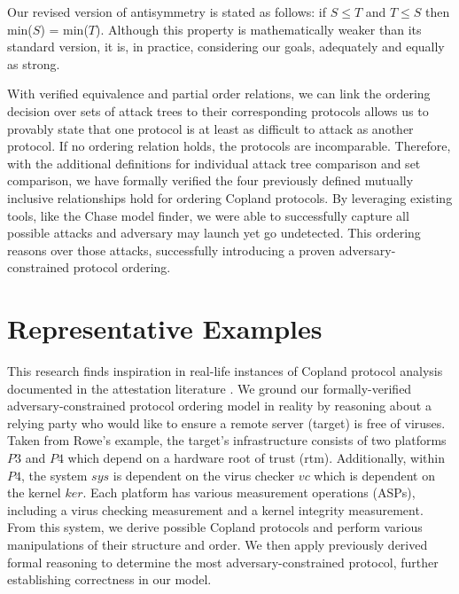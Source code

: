 \documentclass[runningheads]{llncs}
\theoremstyle{definition}
\begin{document}
Our revised version of antisymmetry is stated as follows: if $S \le T$ and $T \le S$ then min($S$) = min($T$). Although this property is mathematically weaker than its standard version, it is, in practice, considering our goals, adequately and equally as strong.


With verified equivalence and partial order relations, we can link the ordering decision over sets of attack trees to their corresponding protocols allows us to provably state that one protocol is at least as difficult to attack as another protocol. If no ordering relation holds, the protocols are incomparable. Therefore, with the additional definitions for individual attack tree comparison and set comparison, we have formally verified the four previously defined mutually inclusive relationships hold for ordering Copland protocols. By leveraging existing tools, like the Chase model finder, we were able to successfully capture all possible attacks and adversary may launch yet go undetected. This ordering reasons over those attacks, successfully introducing a proven adversary-constrained protocol ordering. 


\section{Representative Examples}

This research finds inspiration in real-life instances of Copland protocol analysis documented in the attestation literature \cite{Rowe:2021:OnOrdering,Coker::Principles-of-R}. We ground our formally-verified adversary-constrained protocol ordering model in reality by reasoning about a relying party who would like to ensure a remote server (target) is free of viruses. Taken from Rowe's \cite{Rowe:2016:Confining} example, the target's infrastructure consists of two platforms $P3$ and $P4$ which depend on a hardware root of trust (rtm). Additionally, within $P4$, the system $sys$ is dependent on the virus checker $vc$ which is dependent on the kernel $ker$.  Each platform has various measurement operations (ASPs), including a virus checking measurement and a kernel integrity measurement. From this system, we derive possible Copland protocols and perform various manipulations of their structure and order. We then apply previously derived formal reasoning to determine the most adversary-constrained protocol, further establishing correctness in our model.

\end{document}
